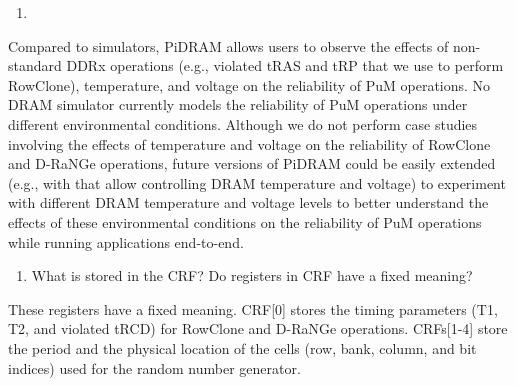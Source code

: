 \newpage
\begin{tcolorbox}
    \begin{enumerate}[label=R3/\arabic*]
       \addtocounter{enumi}{4}
        \item \label{q:r3q5} 
    \end{enumerate}
\end{tcolorbox} 

Compared to simulators, PiDRAM allows users to observe the effects of non-standard DDRx operations (e.g., violated tRAS and tRP that we use to perform RowClone), temperature, and voltage on the reliability of PuM operations. No DRAM simulator currently models the reliability of PuM operations under different environmental conditions. Although we do not perform case studies involving the effects of temperature and voltage on the reliability of RowClone and D-RaNGe operations, future versions of PiDRAM could be easily extended (e.g., with  that allow controlling DRAM temperature and voltage) to experiment with different DRAM temperature and voltage levels to better understand the effects of these environmental conditions on the reliability of PuM operations while running applications end-to-end. 


\vspace{5pt}
\yyboxbegin 
{}
\yyboxend 

\bigbreak
\begin{tcolorbox}
    \begin{enumerate}[label=R3/\arabic*]
       \addtocounter{enumi}{5}
        \item \label{q:r3q6} What is stored in the CRF? Do registers in CRF have a fixed meaning?
    \end{enumerate}
\end{tcolorbox} 

These registers have a fixed meaning. CRF[0] stores the timing parameters (T1, T2, and violated tRCD) for RowClone and D-RaNGe operations. CRFs[1-4] store the period and the physical location of the cells (row, bank, column, and bit indices) used for the random number generator. 

